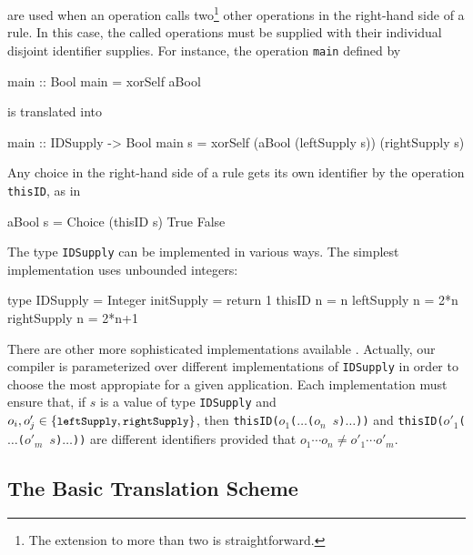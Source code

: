 \documentclass{llncs}
\newcommand{\code}[1]{\mbox{\small\texttt{#1}}}
\begin{document}
are used when an operation calls two\footnote{The
extension to more than two is straightforward.}
other operations in the right-hand side of a rule. In this case,
the called operations must be supplied with their individual disjoint
identifier supplies. For instance, the operation \code{main}
defined by
\label{sec:xor-main}
\begin{curry}
  main :: Bool
  main = xorSelf aBool
\end{curry}
is translated into
\begin{haskell}
  main :: IDSupply -> Bool
  main s = xorSelf (aBool (leftSupply s)) (rightSupply s)
\end{haskell}
Any choice in the right-hand side of a rule gets its own identifier
by the operation \code{thisID}, as in
\begin{haskell}
  aBool s = Choice (thisID s) True False
\end{haskell}
The type \code{IDSupply} can be implemented in various ways.
The simplest implementation uses unbounded integers:
\begin{haskell}
  type IDSupply = Integer
  initSupply    = return 1
  thisID      n = n
  leftSupply  n = 2*n
  rightSupply n = 2*n+1
\end{haskell}
There are other more sophisticated implementations available
\cite{AugustssonRittriSynek94}.
Actually, our compiler is parameterized over different
implementations of \code{IDSupply}
in order to choose the most appropiate for a given application.
Each implementation must ensure that, if $s$ is a value of type
\code{IDSupply} and $o_i,o'_j \in \{\code{leftSupply},\code{rightSupply}\}$,
then \code{thisID($o_1$($\ldots$($o_n$ $s$)$\ldots$))}
and \code{thisID($o'_1$($\ldots$($o'_m$ $s$)$\ldots$))}
are different identifiers provided that
$o_1\cdots o_n \neq o'_1\cdots o'_m$.

\subsection{The Basic Translation Scheme}
\end{document}
